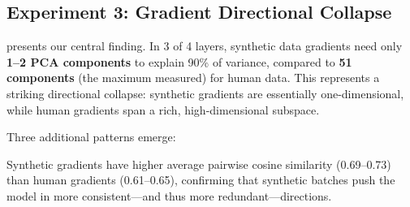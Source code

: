 \subsection{Experiment 3: Gradient Directional Collapse}
\label{sec:results_exp3}

\begin{table}[t]
    \centering
    \caption{Gradient direction analysis across four attention weight matrices. \textbf{Rank-90\%}: number of PCA components to explain 90\% of gradient variance. \textbf{Cos Sim}: average pairwise cosine similarity among gradients within each condition. \textbf{Overlap}: cosine similarity between the top principal subspaces of human and synthetic gradients. Synthetic gradients occupy a dramatically lower-dimensional subspace in 3 of 4 layers. Best (most concentrated) rank values in \textbf{bold}.}
    \label{tab:directions}
\end{table}

 presents our central finding. In 3 of 4 layers, synthetic data gradients need only \textbf{1--2 PCA components} to explain 90\% of variance, compared to \textbf{51 components} (the maximum measured) for human data. This represents a striking directional collapse: synthetic gradients are essentially one-dimensional, while human gradients span a rich, high-dimensional subspace.

Three additional patterns emerge:

 Synthetic gradients have higher average pairwise cosine similarity (0.69--0.73) than human gradients (0.61--0.65), confirming that synthetic batches push the model in more consistent---and thus more redundant---directions.

